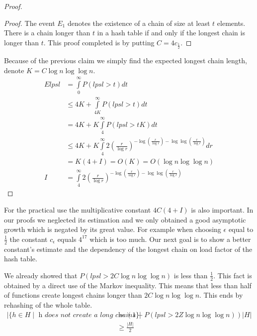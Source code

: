 \begin{proof}
\begin{proof}
The event $E_1$ denotes the existence of a chain of size at least $t$ elements. There is a chain longer than $t$ in a hash table if and only if the longest chain is longer than $t$. This proof completed is by putting $C = 4c_{\frac{1}{2}}$.
\end{proof}

Because of the previous claim we simply find the expected longest chain length, denote $K = C\log n \log \log n$.
\begin{displaymath}
\begin{split}
E lpsl 
	& = \int\limits_0^{\infty} P(lpsl > t) dt \\
	& \leq 4K + \int\limits_{4K}^\infty P(lpsl > t) dt \\
	& = 4K + K \int\limits_4^\infty P(lpsl > tK) dt \\
	& \leq 4K + K \int\limits_4^\infty 2 \left(\frac{r}{\log r}\right)^{-\log \left(\frac{r}{\log r}\right) - \log \log \left(\frac{r}{\log r}\right)} dr \\
	& = K(4 + I) = O(K) = O(\log n \log \log n) \\
I 	& = \int\limits_4^\infty 2 \left(\frac{r}{\log r}\right)^{-\log \left(\frac{r}{\log r}\right) - \log \log \left(\frac{r}{\log r}\right)}
\end{split}
\end{displaymath}
\end{proof}

For the practical use the multiplicative constant $4C(4 + I)$ is also important. In our proofs we neglected its estimation and we only obtained a good asymptotic growth which is negated by its great value. For example when choosing $\epsilon$ equal to $\frac{1}{2}$ the constant $c_\epsilon$ equals $4 ^ 17$ which is too much. Our next goal is to show a better constant's estimate and the dependency of the longest chain on load factor of the hash table.

We already showed that $P(lpsl > 2C \log n \log \log n)$ is less than $\frac{1}{2}$. This fact is obtained by a direct use of the Markov inequality. This means that less than half of functions create longest chains longer than $2C \log n \log \log n$. This ends by rehashing of the whole table.
\begin{displaymath}
\begin{split}
|\lbrace h \in H \mid \textit{ h does not create a long chains} \rbrace| 
	& = \left(1 - P(lpsl > 2Z \log n \log \log n)\right) |H|  \\
	& \geq \frac{|H|}{2} \\
\end{split}
\end{displaymath}

